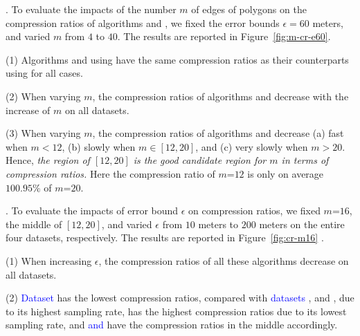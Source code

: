 .
To evaluate the impacts of the number $m$ of edges of polygons on the
compression ratios of algorithms \cist and \cista, we fixed the error bounds {$\epsilon =60$ meters}, and varied $m$ from $4$ to $40$. The results are reported in Figure~\ref{fig:m-cr-e60}.

\ni(1) Algorithms \cist and \cista using \rpia have the same compression ratios as their counterparts using \cpia for all cases.

\ni(2) When varying $m$, the compression ratios of algorithms
{\cist and \cista} decrease with the increase of $m$ on all datasets.

\ni(3) When varying $m$, the compression ratios of algorithms {\cist and \cista} decrease (a) fast when $m < 12$, (b) slowly when $m \in [12, 20]$, and (c) very slowly when $m > 20$. Hence, \emph{the region of $[12, 20]$ is the good candidate region for $m$ in terms of compression ratios.}
Here the compression ratio of $m$=$12$ is only on average {$100.95\%$} of $m$=$20$.



.
To evaluate the impacts of error bound $\epsilon$ on compression ratios, we fixed {$m$=$16$}, the middle of $[12, 20]$, and varied $\epsilon$ from $10$ meters to $200$ meters on the entire four datasets, respectively.
The results are reported in Figure~\ref{fig:cr-m16} .


\ni (1) When increasing $\epsilon$, the compression ratios of all these algorithms decrease on all datasets.

\ni (2) \textcolor{blue}{Dataset} \pricar has the lowest compression ratios, compared with \textcolor{blue}{datasets} \mopsi, \sercar and \geolife, due to its highest sampling rate,
\textcolor{blue}{\sercar} has the highest compression ratios due to its lowest sampling rate, and \textcolor{blue}{\geolife and \mopsi} have the compression ratios in the middle accordingly.

